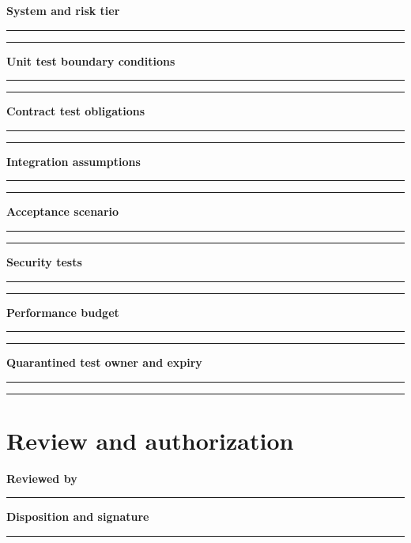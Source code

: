 \documentclass[10pt,letterpaper]{article}
\begin{document}
\textbf{System and risk tier}\par
\noindent\rule{\linewidth}{0.35pt}\par\vspace{0.7em}
\noindent\rule{\linewidth}{0.35pt}\par\vspace{0.7em}
\textbf{Unit test boundary conditions}\par
\noindent\rule{\linewidth}{0.35pt}\par\vspace{0.7em}
\noindent\rule{\linewidth}{0.35pt}\par\vspace{0.7em}
\textbf{Contract test obligations}\par
\noindent\rule{\linewidth}{0.35pt}\par\vspace{0.7em}
\noindent\rule{\linewidth}{0.35pt}\par\vspace{0.7em}
\textbf{Integration assumptions}\par
\noindent\rule{\linewidth}{0.35pt}\par\vspace{0.7em}
\noindent\rule{\linewidth}{0.35pt}\par\vspace{0.7em}
\textbf{Acceptance scenario}\par
\noindent\rule{\linewidth}{0.35pt}\par\vspace{0.7em}
\noindent\rule{\linewidth}{0.35pt}\par\vspace{0.7em}
\textbf{Security tests}\par
\noindent\rule{\linewidth}{0.35pt}\par\vspace{0.7em}
\noindent\rule{\linewidth}{0.35pt}\par\vspace{0.7em}
\textbf{Performance budget}\par
\noindent\rule{\linewidth}{0.35pt}\par\vspace{0.7em}
\noindent\rule{\linewidth}{0.35pt}\par\vspace{0.7em}
\textbf{Quarantined test owner and expiry}\par
\noindent\rule{\linewidth}{0.35pt}\par\vspace{0.7em}
\noindent\rule{\linewidth}{0.35pt}\par\vspace{0.7em}
\section{Review and authorization}
\textbf{Reviewed by}\par
\noindent\rule{\linewidth}{0.35pt}\par\vspace{0.7em}
\textbf{Disposition and signature}\par
\noindent\rule{\linewidth}{0.35pt}\par\vspace{0.7em}
\end{document}
